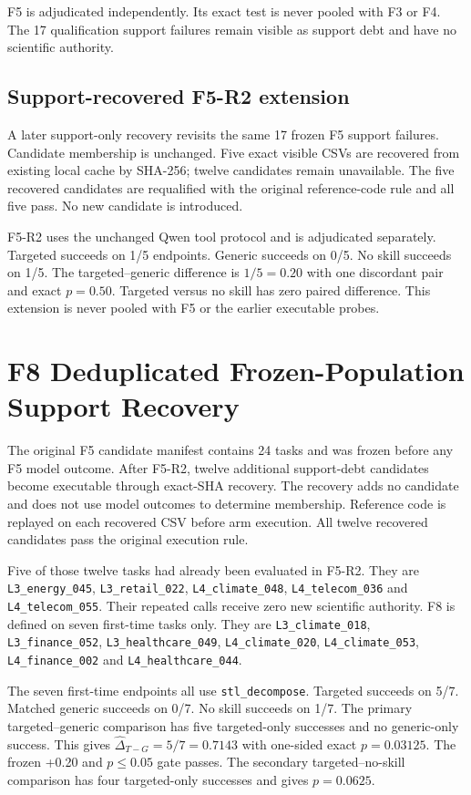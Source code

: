 F5 is adjudicated independently. Its exact test is never pooled with F3 or F4. The 17 qualification support failures remain visible as support debt and have no scientific authority.

\subsection{Support-recovered F5-R2 extension}
A later support-only recovery revisits the same 17 frozen F5 support failures. Candidate membership is unchanged. Five exact visible CSVs are recovered from existing local cache by SHA-256; twelve candidates remain unavailable. The five recovered candidates are requalified with the original reference-code rule and all five pass. No new candidate is introduced.

F5-R2 uses the unchanged Qwen tool protocol and is adjudicated separately. Targeted succeeds on 1/5 endpoints. Generic succeeds on 0/5. No skill succeeds on 1/5. The targeted--generic difference is $1/5=0.20$ with one discordant pair and exact $p=0.50$. Targeted versus no skill has zero paired difference. This extension is never pooled with F5 or the earlier executable probes.

\section{F8 Deduplicated Frozen-Population Support Recovery}
\label{app:f8}
The original F5 candidate manifest contains 24 tasks and was frozen before any F5 model outcome. After F5-R2, twelve additional support-debt candidates become executable through exact-SHA recovery. The recovery adds no candidate and does not use model outcomes to determine membership. Reference code is replayed on each recovered CSV before arm execution. All twelve recovered candidates pass the original execution rule.

Five of those twelve tasks had already been evaluated in F5-R2. They are \texttt{L3\_energy\_045}, \texttt{L3\_retail\_022}, \texttt{L4\_climate\_048}, \texttt{L4\_telecom\_036} and \texttt{L4\_telecom\_055}. Their repeated calls receive zero new scientific authority. F8 is defined on seven first-time tasks only. They are \texttt{L3\_climate\_018}, \texttt{L3\_finance\_052}, \texttt{L3\_healthcare\_049}, \texttt{L4\_climate\_020}, \texttt{L4\_climate\_053}, \texttt{L4\_finance\_002} and \texttt{L4\_healthcare\_044}.

The seven first-time endpoints all use \texttt{stl\_decompose}. Targeted succeeds on 5/7. Matched generic succeeds on 0/7. No skill succeeds on 1/7. The primary targeted--generic comparison has five targeted-only successes and no generic-only success. This gives $\widehat{\Delta}_{T-G}=5/7=0.7143$ with one-sided exact $p=0.03125$. The frozen +0.20 and $p\leq0.05$ gate passes. The secondary targeted--no-skill comparison has four targeted-only successes and gives $p=0.0625$.

